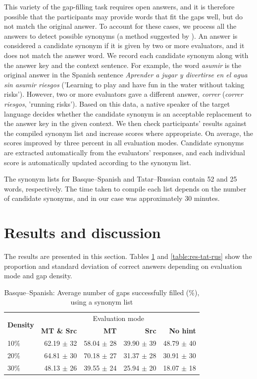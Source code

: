 \documentclass[11pt]{article}
\newcommand{\comment}[1]{}
\begin{document}
This variety of the gap-filling task requires open answers, and it is therefore possible that the participants may
provide words that fit the gaps well, but do not match the original answer. To account for
these cases, we process all the answers to detect possible synonyms (a method suggested by \cite{oregan13}). An answer is
considered a candidate synonym if it is given by two or more evaluators, and it does not match
the answer word. We record each candidate synonym along with the answer key and the
context sentence. For example, the word \emph{asumir} is the original answer in the Spanish sentence \emph{Aprender a jugar y divertirse en el agua sin asumir riesgos} ('Learning to play and have fun in the water without taking risks'). However, two or more evaluators gave a different answer, \emph{correr} (\emph{correr riesgos}, 'running risks'). Based on this data, a native speaker of the target language decides
whether the candidate synonym is an acceptable replacement to the answer key in the given
context. We then check participants' results against the compiled synonym list and
increase scores where appropriate. On average, the scores improved by three percent in all evaluation modes. Candidate synonyms are extracted automatically from the evaluators' responses,  and each individual score is automatically updated according to the synonym list.

The synonym lists for Basque--Spanish and Tatar--Russian contain 52 and 25 words, respectively. The time taken to compile each list depends on the number of candidate synonyms, and in our case was approximately 30 minutes. 

\section{Results and discussion}
\label{sec:results}

The results are presented in this section. Tables \ref{table:res-eus-spa} and \ref{table:res-tat-rus} 
show
the proportion and standard deviation of correct answers depending on evaluation mode and gap density.

\begin{table}
\centering
  \begin{tabular}{|l|r|r|r|r|}
  \hline
 \multirow{2}{*}{\textbf{Density}} & \multicolumn{4}{|c|}{Evaluation mode} \\\cline{2-5}
                                            & \textbf{MT \& Src} & \textbf{MT} & \textbf{Src} & \textbf{No hint} \\
\hline
10\%&62.19 \(\pm\) 32&58.04 \(\pm\) 28&39.90 \(\pm\) 39&48.79 \(\pm\) 40\\
20\%&64.81 \(\pm\) 30&70.18 \(\pm\) 27&31.37 \(\pm\) 28&30.91 \(\pm\) 30\\
30\%&48.13 \(\pm\) 26&39.55 \(\pm\) 24&25.94 \(\pm\) 20&18.07 \(\pm\) 18\\
\hline
\end{tabular}
\caption {Basque--Spanish: Average number of gaps successfully filled (\%), using a synonym list} 
\label{table:res-eus-spa}
\end{table}
\end{document}
